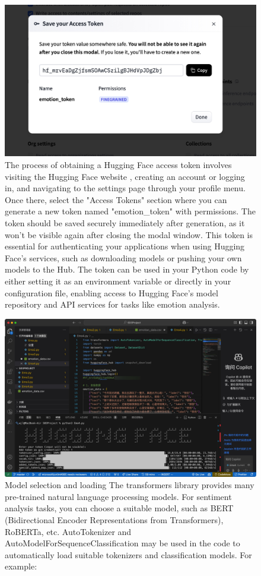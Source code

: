 \documentclass[journal]{IEEEtran}
\begin{document}
\begin{figure}[htb]
    \centering
    \includegraphics[width=\linewidth]{figures/figure_5.jpg}
    \caption{
    The process of obtaining a Hugging Face access token involves visiting the Hugging Face website , creating an account or logging in, and navigating to the settings page through your profile menu. Once there, select the "Access Tokens" section where you can generate a new token named "emotion_token" with  permissions. The token should be saved securely immediately after generation, as it won't be visible again after closing the modal window. 
    This token is essential for authenticating your applications when using Hugging Face's services, such as downloading models or pushing your own models to the Hub. The token can be used in your Python code by either setting it as an environment variable or directly in your configuration file, enabling access to Hugging Face's model repository and API services for tasks like emotion analysis.
}
    \label{fig:my_label}
\end{figure}


\begin{figure}[htb]
    \centering
    \includegraphics[width=\linewidth]{figures/figure_6.jpg}
    \caption{
Model selection and loading
The transformers library provides many pre-trained natural language processing models. For sentiment analysis tasks, you can choose a suitable model, such as BERT (Bidirectional Encoder Representations from Transformers), RoBERTa, etc.
AutoTokenizer and AutoModelForSequenceClassification may be used in the code to automatically load suitable tokenizers and classification models. For example:
}
    \label{fig:my_label}
\end{figure}
\end{document}
